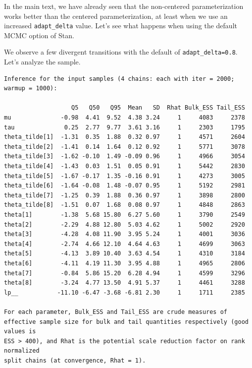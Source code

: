 \documentclass[american,]{article}
\begin{document}
In the main text, we have already seen that the non-centered
parameterization works better than the centered parameterization, at
least when we use an increased \texttt{adapt\_delta} value. Let's see
what happens when using the default MCMC option of Stan.

We observe a few divergent transitions with the default of
\texttt{adapt\_delta=0.8}. Let's analyze the sample.

\begin{verbatim}
Inference for the input samples (4 chains: each with iter = 2000; warmup = 1000):

                   Q5   Q50   Q95  Mean   SD  Rhat Bulk_ESS Tail_ESS
mu              -0.98  4.41  9.52  4.38 3.24     1     4083     2378
tau              0.25  2.77  9.77  3.61 3.16     1     2303     1795
theta_tilde[1]  -1.31  0.35  1.88  0.32 0.97     1     4571     2604
theta_tilde[2]  -1.41  0.14  1.64  0.12 0.92     1     5771     3078
theta_tilde[3]  -1.62 -0.10  1.49 -0.09 0.96     1     4966     3054
theta_tilde[4]  -1.43  0.03  1.51  0.05 0.91     1     5442     2830
theta_tilde[5]  -1.67 -0.17  1.35 -0.16 0.91     1     4273     3005
theta_tilde[6]  -1.64 -0.08  1.48 -0.07 0.95     1     5192     2981
theta_tilde[7]  -1.25  0.39  1.88  0.36 0.97     1     3898     2800
theta_tilde[8]  -1.51  0.07  1.68  0.08 0.97     1     4848     2863
theta[1]        -1.38  5.68 15.80  6.27 5.60     1     3790     2549
theta[2]        -2.29  4.88 12.80  5.03 4.62     1     5002     2920
theta[3]        -4.28  4.08 11.90  3.95 5.24     1     4001     3036
theta[4]        -2.74  4.66 12.10  4.64 4.63     1     4699     3063
theta[5]        -4.13  3.89 10.40  3.63 4.54     1     4310     3184
theta[6]        -4.11  4.19 11.30  3.95 4.88     1     4965     2806
theta[7]        -0.84  5.86 15.20  6.28 4.94     1     4599     3296
theta[8]        -3.24  4.77 13.50  4.91 5.37     1     4461     3288
lp__           -11.10 -6.47 -3.68 -6.81 2.30     1     1711     2385

For each parameter, Bulk_ESS and Tail_ESS are crude measures of 
effective sample size for bulk and tail quantities respectively (good values is 
ESS > 400), and Rhat is the potential scale reduction factor on rank normalized
split chains (at convergence, Rhat = 1).
\end{verbatim}
\end{document}
